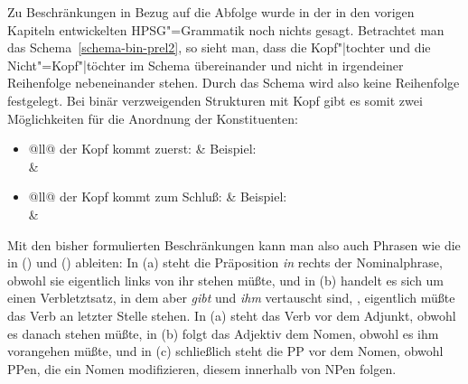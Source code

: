 Zu Beschränkungen in Bezug auf die Abfolge wurde in der in den vorigen Kapiteln entwickelten
HPSG"=Grammatik noch nichts gesagt. Betrachtet man das Schema~\ref{schema-bin-prel2}, so sieht man,
dass die Kopf"|tochter und die Nicht"=Kopf"|töchter im Schema übereinander und nicht in irgendeiner
Reihenfolge nebeneinander stehen. Durch das Schema wird also keine Reihenfolge festgelegt. Bei binär
verzweigenden Strukturen mit Kopf gibt es somit zwei Möglichkeiten für die Anordnung der
Konstituenten:
\begin{itemize}
\item \begin{tabular}[t]{@{}ll@{}}
der Kopf kommt zuerst:                                   & Beispiel:\\
%
&%
\\
\end{tabular}
\item \begin{tabular}[t]{@{}ll@{}}
der Kopf kommt zum Schluß:                            & Beispiel:\\
%
&%
\\
\end{tabular}
\end{itemize}


\noindent
Mit den bisher formulierten Beschränkungen kann man also auch Phrasen wie die in () und () ableiten:
\eal
{}
\zl
\eal
{}
\zl
In (a) steht die Präposition \emph{in} rechts der Nominalphrase, obwohl sie eigentlich links von
ihr stehen müßte, und in (b) handelt es sich um einen Verbletztsatz, in dem aber \emph{gibt} und \emph{ihm}
vertauscht sind, \dash, eigentlich müßte das Verb an letzter Stelle stehen. In (a) steht das Verb vor
dem Adjunkt, obwohl es danach stehen müßte, in (b) folgt das Adjektiv dem Nomen,
obwohl es ihm vorangehen müßte, und in (c) schließlich steht die PP vor dem Nomen, obwohl
PPen, die ein Nomen modifizieren, diesem innerhalb von NPen folgen.

